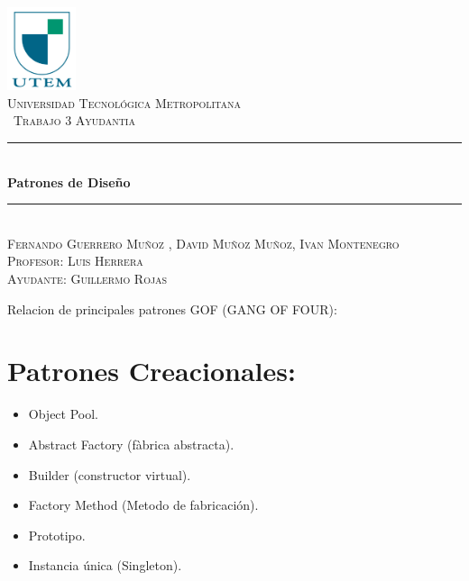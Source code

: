 \documentclass[10pt]{article}
\newcommand{\HRule}{\rule{\linewidth}{0.5mm}}
\begin{document}
\begin{titlepage}
\begin{center}
\includegraphics[width=0.15\textwidth]{Utem}~\\[1cm]

\textsc{\normalsize Universidad Tecnológica Metropolitana}\\[1.5cm]

\textsc{\ Trabajo 3 Ayudantia }\\[0.5cm]

\HRule \\[0.4cm]
{ \huge \bf Patrones de Diseño}\\[0.4cm]

\HRule \\[1.5cm]
\textsc{\large Fernando Guerrero Muñoz , David Muñoz Muñoz, Ivan Montenegro }\\[1cm]
\textsc{\large Profesor: Luis Herrera}\\
\textsc{\large Ayudante: Guillermo Rojas}\\
\end{center}
\end{titlepage}

\newpage

\begin{titlepage}
{ \huge  Relacion de principales patrones GOF (GANG OF FOUR):}

\section{Patrones Creacionales:}
\begin{itemize}


\item Object Pool. 
\item Abstract Factory (fàbrica abstracta).
\item Builder (constructor virtual).
\item Factory Method (Metodo de fabricación).
\item Prototipo.
\item Instancia única (Singleton).


\end{itemize}
\end{titlepage}
\end{document}
